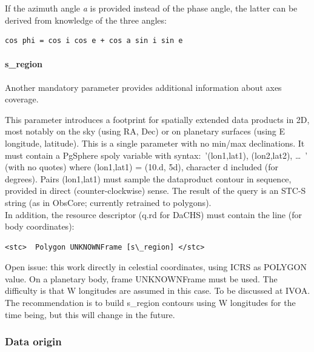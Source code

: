 \documentclass[11pt,a4paper]{ivoa}
\begin{document}
If the azimuth angle \emph{a} is provided instead of the phase angle, the latter can be derived from knowledge of the three angles:






\begin{verbatim}cos phi = cos i cos e + cos a sin i sin e\end{verbatim}




\paragraph{s\_region}

Another mandatory parameter provides additional information about axes coverage.

This parameter introduces a footprint for spatially extended data products in 2D, most notably on the sky (using RA, Dec) or on planetary surfaces (using E longitude, latitude). This is a single parameter with no min/max declinations. It must contain a PgSphere spoly variable with syntax: '{(lon1,lat1), (lon2,lat2), … }' (with no quotes) where (lon1,lat1) = (10.d, 5d), character d included (for degrees). Pairs (lon1,lat1) must sample the dataproduct contour in sequence, provided in direct (counter-clockwise) sense. The result of the query is an STC-S string (as in ObsCore; currently retrained to polygons).\\

In addition, the resource descriptor (q.rd for DaCHS) must contain the line (for body coordinates):






\begin{verbatim}<stc>  Polygon UNKNOWNFrame [s\_region] </stc>\end{verbatim}




Open issue: this work directly in celestial coordinates, using ICRS as POLYGON value. On a planetary body, frame UNKNOWNFrame must be used. The difficulty is that W longitudes are assumed in this case. To be discussed at IVOA. The recommendation is to build s\_region contours using W longitudes for the time being, but this will change in the future.

\subsubsection{Data origin}
\end{document}
